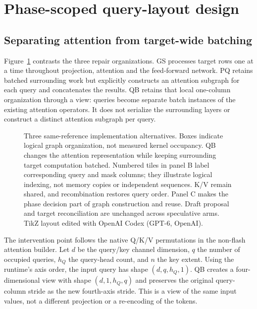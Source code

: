 \section{Phase-scoped query-layout design}
\label{sec:method}
\subsection{Separating attention from target-wide batching}
Figure~\ref{fig:design} contrasts the three repair organizations. GS processes target rows one at a time throughout projection, attention and the feed-forward network. PQ retains batched surrounding work but explicitly constructs an attention subgraph for each query and concatenates the results. QB retains that local one-column organization through a view: queries become separate batch instances of the existing attention operators. It does not serialize the surrounding layers or construct a distinct attention subgraph per query.

\begin{figure}[t]
\centering
\caption{Three same-reference implementation alternatives. Boxes indicate logical graph organization, not measured kernel occupancy. QB changes the attention representation while keeping surrounding target computation batched. Numbered tiles in panel B label corresponding query and mask columns; they illustrate logical indexing, not memory copies or independent sequences. K/V remain shared, and recombination restores query order. Panel C makes the phase decision part of graph construction and reuse. Draft proposal and target reconciliation are unchanged across speculative arms. TikZ layout edited with OpenAI Codex (GPT-6, OpenAI).}
\label{fig:design}
\end{figure}

The intervention point follows the native Q/K/V permutations in the non-flash attention builder. Let $d$ be the query/key channel dimension, $q$ the number of occupied queries, $h_Q$ the query-head count, and $n$ the key extent. Using the runtime's axis order, the input query has shape $(d,q,h_Q, 1)$. QB creates a four-dimensional view with shape $(d, 1,h_Q,q)$ and preserves the original query-column stride as the new fourth-axis stride. This is a view of the same input values, not a different projection or a re-encoding of the tokens.

